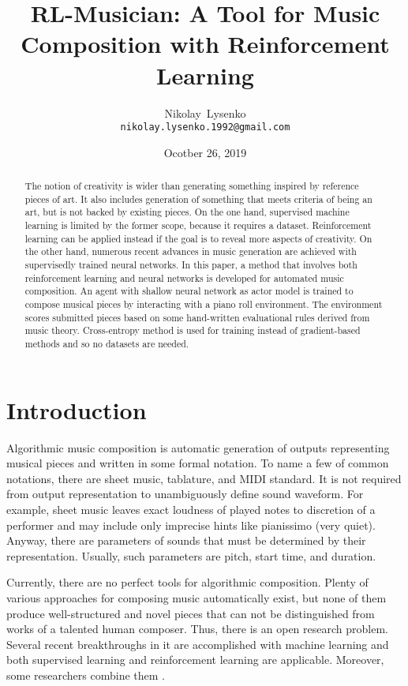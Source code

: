 \documentclass{article}
\title{RL-Musician: A Tool for Music Composition with Reinforcement Learning}
\date{Ocotber 26, 2019}
\author{
  Nikolay~Lysenko\\
  \texttt{nikolay.lysenko.1992@gmail.com} \\
}
\begin{document}
\maketitle

\begin{abstract}
The notion of creativity is wider than generating something inspired by reference pieces of art. It also includes generation of something that meets criteria of being an art, but is not backed by existing pieces. On the one hand, supervised machine learning is limited by the former scope, because it requires a dataset. Reinforcement learning can be applied instead if the goal is to reveal more aspects of creativity. On the other hand, numerous recent advances in music generation are achieved with supervisedly trained neural networks. In this paper, a method that involves both reinforcement learning and neural networks is developed for automated music composition. An agent with shallow neural network as actor model is trained to compose musical pieces by interacting with a piano roll environment. The environment scores submitted pieces based on some hand-written evaluational rules derived from music theory. Cross-entropy method is used for training instead of gradient-based methods and so no datasets are needed.
\end{abstract}



\section{Introduction}
\label{sec:introduction}

Algorithmic music composition is automatic generation of outputs representing musical pieces and written in some formal notation. To name a few of common notations, there are sheet music, tablature, and MIDI standard. It is not required from output representation to unambiguously define sound waveform. For example, sheet music leaves exact loudness of played notes to discretion of a performer and may include only imprecise hints like pianissimo (very quiet). Anyway, there are parameters of sounds that must be determined by their representation. Usually, such parameters are pitch, start time, and duration.

Currently, there are no perfect tools for algorithmic composition. Plenty of various approaches for composing music automatically exist, but none of them produce well-structured and novel pieces that can not be distinguished from works of a talented human composer. Thus, there is an open research problem. Several recent breakthroughs in it are accomplished with machine learning and both supervised learning \cite{johnson2017generating, payne2019musenet} and reinforcement learning \cite{smith2012reinforcement} are applicable. Moreover, some researchers combine them \cite{jaques2016generating, kotecha2018bach, kumar2019polyphonic}.
\end{document}
